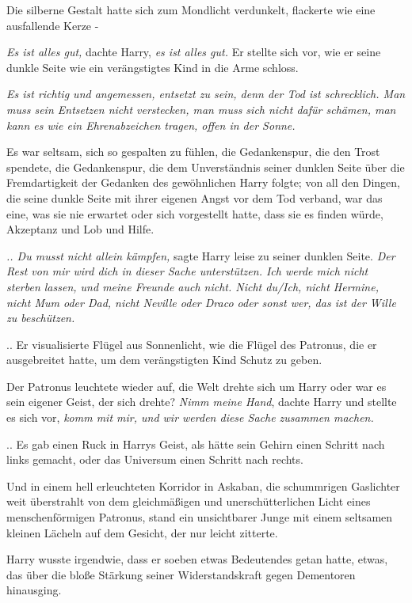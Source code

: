 {Die silberne Gestalt hatte sich zum Mondlicht verdunkelt, flackerte wie eine ausfallende Kerze -

\emph{Es ist alles gut,} dachte Harry, \emph{es ist alles gut.} Er stellte sich vor, wie er seine dunkle Seite wie ein verängstigtes Kind in die Arme schloss.

\emph{Es ist richtig und angemessen, entsetzt zu sein, denn der Tod ist schrecklich. Man muss sein Entsetzen nicht verstecken, man muss sich nicht dafür schämen, man kann es wie ein Ehrenabzeichen tragen, offen in der Sonne.}

Es war seltsam, sich so gespalten zu fühlen, die Gedankenspur, die den Trost spendete, die Gedankenspur, die dem Unverständnis seiner dunklen Seite über die Fremdartigkeit der Gedanken des gewöhnlichen Harry folgte; von all den Dingen, die seine dunkle Seite mit ihrer eigenen Angst vor dem Tod verband, war das eine, was sie nie erwartet oder sich vorgestellt hatte, dass sie es finden würde, Akzeptanz und Lob und Hilfe.

\emph{.. Du musst nicht allein kämpfen,} sagte Harry leise zu seiner dunklen Seite. \emph{Der Rest von mir wird dich in dieser Sache unterstützen. Ich werde mich nicht sterben lassen, und meine Freunde auch nicht. Nicht du/Ich, nicht Hermine, nicht Mum oder Dad, nicht Neville oder Draco oder sonst wer, das ist der Wille zu beschützen.}

.. Er visualisierte Flügel aus Sonnenlicht, wie die Flügel des Patronus, die er ausgebreitet hatte, um dem verängstigten Kind Schutz zu geben.

Der Patronus leuchtete wieder auf, die Welt drehte sich um Harry oder war es sein eigener Geist, der sich drehte? \emph{Nimm meine Hand}, dachte Harry und stellte es sich vor, \emph{komm mit mir, und wir werden diese Sache zusammen machen.}

.. Es gab einen Ruck in Harrys Geist, als hätte sein Gehirn einen Schritt nach links gemacht, oder das Universum einen Schritt nach rechts.

Und in einem hell erleuchteten Korridor in Askaban, die schummrigen Gaslichter weit überstrahlt von dem gleichmäßigen und unerschütterlichen Licht eines menschenförmigen Patronus, stand ein unsichtbarer Junge mit einem seltsamen kleinen Lächeln auf dem Gesicht, der nur leicht zitterte.

Harry wusste irgendwie, dass er soeben etwas Bedeutendes getan hatte, etwas, das über die bloße Stärkung seiner Widerstandskraft gegen Dementoren hinausging.

}
